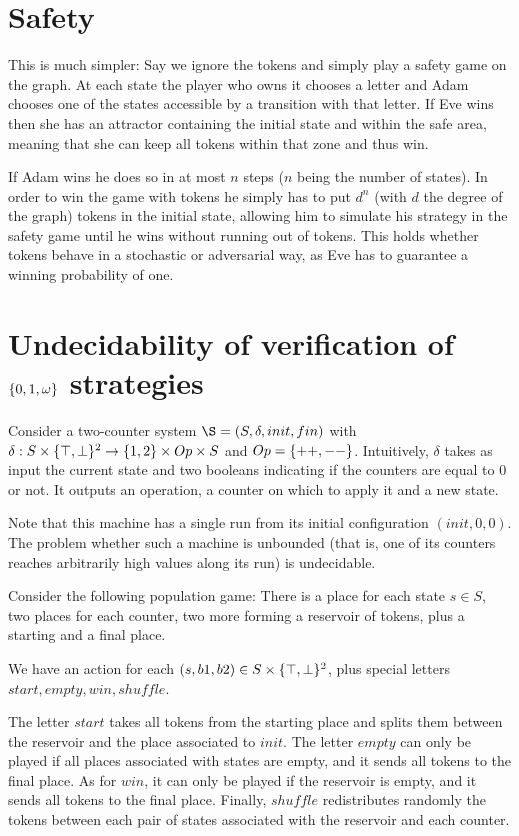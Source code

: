 \documentclass{article}
\begin{document}
\newpage

\section{Safety}

This is much simpler: Say we ignore the tokens and simply play a safety game on the graph. At each state the player who owns it chooses a letter and Adam chooses one of the states accessible by a transition with that letter. If Eve wins then she has an attractor containing the initial state and within the safe area, meaning that she can keep all tokens within that zone and thus win. 

If Adam wins he does so in at most $n$ steps ($n$ being the number of states). In order to win the game with tokens he simply has to put $d^n$ (with $d$ the degree of the graph) tokens in the initial state, allowing him to simulate his strategy in the safety game until he wins without running out of tokens. This holds whether tokens behave in a stochastic or adversarial way, as Eve has to guarantee a winning probability of one.

\section{Undecidability of verification of $\{ 0,1, \omega \}$ strategies}

Consider a two-counter system $\S = (S, \delta, init, fin)$ with $\delta : S \times \{ \top, \bot \}^2 \to \{ 1,2 \} \times Op \times S$ and $Op = \{ ++, -- \}$.
Intuitively, $\delta$ takes as input the current state and two booleans indicating if the counters are equal to $0$ or not. It outputs an operation, a counter on which to apply it and a new state.

Note that this machine has a single run from its initial configuration $(init, 0, 0)$.
The problem whether such a machine is unbounded (that is, one of its counters reaches arbitrarily high values along its run) is undecidable.

Consider the following population game: There is a place for each state $s \in S$, two places for each counter, two more forming a reservoir of tokens, plus a starting and a final place.

We have an action for each $(s, b1, b2) \in S \times \{ \top, \bot \}^2$, plus special letters $start, empty, win, shuffle$.

The letter $start$ takes all tokens from the starting place and splits them between the reservoir and the place associated to $init$.
The letter $empty$ can only be played if all places associated with states are empty, and it sends all tokens to the final place.
As for $win$, it can only be played if the reservoir is empty, and it sends all tokens to the final place.
Finally, $shuffle$ redistributes randomly the tokens between each pair of states associated with the reservoir and each counter.
\end{document}
